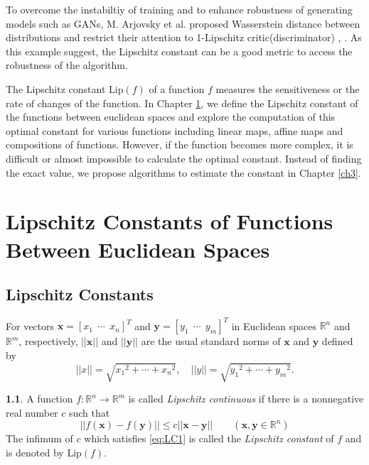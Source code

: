 \documentclass[12pt]{report}
\numberwithin{figure}{chapter}
\theoremstyle{plain}
\theoremstyle{definition}
\newtheorem{definition}[theorem]{\protect\definitionname}
\theoremstyle{corollary}
\theoremstyle{definition}
\theoremstyle{plain}
\theoremstyle{definition}
\theoremstyle{plain}
\providecommand{\definitionname}{Definition}
\newcommand\bx{\ensuremath{\boldsymbol x}}
\newcommand\by{\ensuremath{\boldsymbol y}}
\newcommand\lip{\ensuremath{\text{Lip}}}
\begin{document}
To overcome the instabiltiy of training and to enhance robustness of generating models such as GANs, M. Arjovsky et al. proposed Wasserstein distance between distributions and restrict their attention to 1-Lipschitz critic(discriminator) \cite{MA-SC}, \cite{GI-AF}.
As this example suggest, the Lipschitz constant can be a good metric to access the robustness of the algorithm.

The Lipschitz constant \(\lip(f)\) of a function \(f\) measures the sensitiveness or the rate of changes of the function.
In Chapter \ref{ch2}, we define the Lipschitz constant of the functions between euclidean spaces and explore the computation of this optimal constant for various functions including linear maps, affine maps and compositions of functions.
However, if the function becomes more complex, it is difficult or almost impossible to calculate the optimal constant.
Instead of finding the exact value, we propose algorithms to estimate the constant in Chapter \ref{ch3}.

\chapter{Lipschitz Constants of Functions Between Euclidean Spaces}\label{ch2}

\section{Lipschitz Constants}
For vectors \(\bx=[x_1\:\:\cdots\:\:x_n]^T\) and \(\by=[y_1\:\:\cdots\:\:y_m]^T\) in Euclidean spaces \(\mathbb R^n\) and \(\mathbb R^m\), respectively, \(||\bx||\) and \(||\by||\) are the usual standard norms of \bx{} and \by{} defined by
\begin{equation}\label{eq:euclidean_norm}
||x||=\sqrt{{x_1}^2+\cdots+{x_n}^2},\quad ||y||=\sqrt{{y_1}^2+\cdots+{y_m}^2}.
\end{equation}

\begin{definition}\label{LC}
A function \(f:\mathbb R^n\to\mathbb R^m\) is called \emph{Lipschitz continuous} if there is a nonnegative real number \(c\) such that
\begin{equation}\label{eq:LC1}
||f(\bx)-f(\by)||\le c||\bx-\by||\qquad(\bx,\by\in\mathbb R^n)
\end{equation}
The infimum of \(c\) which satisfies \eqref{eq:LC1} is called the \emph{Lipschitz constant} of \(f\) and is denoted by \(\lip(f)\).
\end{definition}
\end{document}
